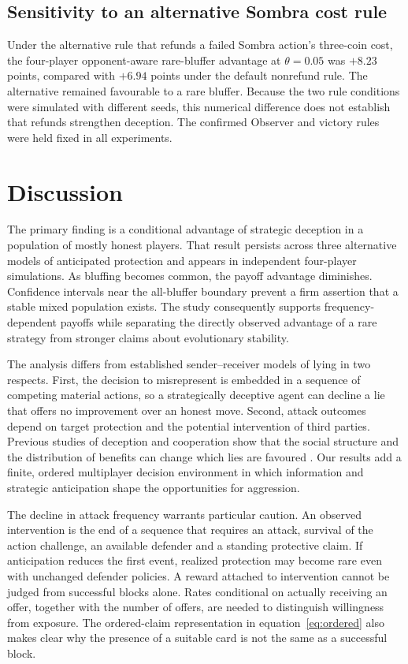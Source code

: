 \documentclass[11pt,a4paper]{article}
\begin{document}
\subsection{Sensitivity to an alternative Sombra cost rule}
Under the alternative rule that refunds a failed Sombra action's three-coin cost, the four-player opponent-aware rare-bluffer advantage at $\theta=0.05$ was $+8.23$ points, compared with $+6.94$ points under the default nonrefund rule. The alternative remained favourable to a rare bluffer. Because the two rule conditions were simulated with different seeds, this numerical difference does not establish that refunds strengthen deception. The confirmed Observer and victory rules were held fixed in all experiments.

\section{Discussion}
The primary finding is a conditional advantage of strategic deception in a population of mostly honest players. That result persists across three alternative models of anticipated protection and appears in independent four-player simulations. As bluffing becomes common, the payoff advantage diminishes. Confidence intervals near the all-bluffer boundary prevent a firm assertion that a stable mixed population exists. The study consequently supports frequency-dependent payoffs while separating the directly observed advantage of a rare strategy from stronger claims about evolutionary stability.

The analysis differs from established sender--receiver models of lying in two respects. First, the decision to misrepresent is embedded in a sequence of competing material actions, so a strategically deceptive agent can decline a lie that offers no improvement over an honest move. Second, attack outcomes depend on target protection and the potential intervention of third parties. Previous studies of deception and cooperation show that the social structure and the distribution of benefits can change which lies are favoured \citep{capraro2019,mcnally2013}. Our results add a finite, ordered multiplayer decision environment in which information and strategic anticipation shape the opportunities for aggression.

The decline in attack frequency warrants particular caution. An observed intervention is the end of a sequence that requires an attack, survival of the action challenge, an available defender and a standing protective claim. If anticipation reduces the first event, realized protection may become rare even with unchanged defender policies. A reward attached to intervention cannot be judged from successful blocks alone. Rates conditional on actually receiving an offer, together with the number of offers, are needed to distinguish willingness from exposure. The ordered-claim representation in equation~\eqref{eq:ordered} also makes clear why the presence of a suitable card is not the same as a successful block.
\end{document}
